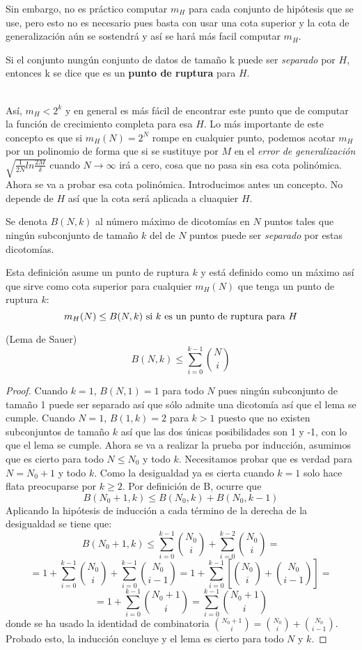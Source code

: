 Sin embargo, no es práctico computar $m_{H}$ para cada conjunto de hipótesis que se use, pero esto no es necesario pues basta con usar una cota superior y la cota de generalización aún se sostendrá y así se hará más facil computar $m_{H}$.
\begin{definicion}
Si el conjunto nungún conjunto de datos de tamaño k puede ser \textit{separado} por $H$, entonces k se dice que es un \textbf{punto de ruptura} para $H$.
\end{definicion}
\cite{abu2012learning}\\
Así, $m_{H} < 2^{k}$ y en general es más fácil de encontrar este punto que de computar la función de crecimiento completa para esa $H$. Lo más importante de este concepto es que si $m_{H}(N)=2^{N}$ rompe en cualquier punto, podemos acotar $m_{H}$ por un polinomio de forma que si se sustituye por $M$ en el \textit{error de generalización} $\sqrt{\frac{1}{2N}ln\frac{2M}{\delta}}$ cuando $N \longrightarrow \infty$ irá a cero, cosa que no pasa sin esa cota polinómica.\\
Ahora se va a probar esa cota polinómica. Introducimos antes un concepto. No depende de $H$ así que la cota será aplicada a cluaquier $H$.
\begin{definicion}
Se denota $B(N,k)$ al número máximo de dicotomías en $N$ puntos tales que ningún subconjunto de tamaño $k$ del de $N$ puntos puede ser \textit{separado} por estas dicotomías.
\end{definicion}
Esta definición asume un punto de ruptura $k$ y está definido como un máximo así que sirve como cota superior para cualquier $m_{H}(N)$ que tenga un punto de ruptura $k$:
\[ m_{H}(N) \leq B(N,k) \textnormal{ si } k \textnormal{ es un punto de ruptura para } H\]
\begin{lema}
(Lema de Sauer) \[ B(N,k) \leq \sum_{i=0}^{k-1} \binom{N}{i} \]
\end{lema}
\begin{proof}
Cuando $k=1$, $B(N,1)=1$ para todo $N$ pues ningún subconjunto de tamaño 1 puede ser separado así que sólo admite una dicotomía así que el lema se cumple. Cuando $N=1$, $B(1,k)=2$ para $k>1$ puesto que no existen subconjuntos de tamaño $k$ así que las dos únicas posibilidades son 1 y -1, con lo que el lema se cumple. Ahora se va a realizar la prueba por inducción, asumimos que es cierto para todo $N \leq N_{0}$ y todo $k$. Necesitamos probar que es verdad para $N=N_{0}+1$ y todo $k$. Como la desigualdad ya es cierta cuando $k=1$ solo hace flata preocuparse por $k \geq 2$. Por definición de B, ocurre que
\[ B(N_{0}+1,k) \leq B(N_{0},k)+B(N_{0},k-1) \]
Aplicando la hipótesis de inducción a cada término de la derecha de la desigualdad se tiene que:
\[ B(N_{0}+1,k) \leq \sum_{i=0}^{k-1} \binom{N_{0}}{i} + \sum_{i=0}^{k-2} \binom{N_{0}}{i} =\] \[ = 1 + \sum_{i=0}^{k-1} \binom{N_{0}}{i} + \sum_{i=0}^{k-1} \binom{N_{0}}{i-1} = 1+ \sum_{i=0}^{k-1} \left[ \binom{N_{0}}{i} + \binom{N_{0}}{i-1} \right] = \] \[ = 1 + \sum_{i=0}^{k-1} \binom{N_{0} + 1}{i} = \sum_{i=0}^{k-1} \binom{N_{0}+1}{i}\]
donde se ha usado la identidad de combinatoria $\binom{N_{0}+1}{i} = \binom{N_{0}}{i}+\binom{N_{0}}{i-1}$. Probado esto, la inducción concluye y el lema es cierto para todo $N$ y $k$.
\end{proof}
